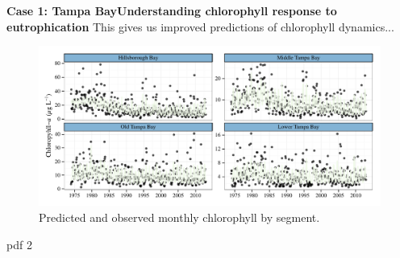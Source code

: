 \documentclass[serif]{beamer}\usepackage[]{graphicx}\usepackage[]{color}
\begin{document}
\begin{frame}{\textbf{Case 1: Tampa Bay}}{\textbf{Understanding chlorophyll response to eutrophication}}
This gives us improved predictions of chlorophyll dynamics...
\begin{figure}[!ht]

{\centering \includegraphics[width=\linewidth]{fig//predvals-1} 

}

\caption[Predicted and observed monthly chlorophyll by segment]{Predicted and observed monthly chlorophyll by segment.}\label{fig:/predvals}
\end{figure}


\end{frame}

pdf 
  2 
\end{document}
